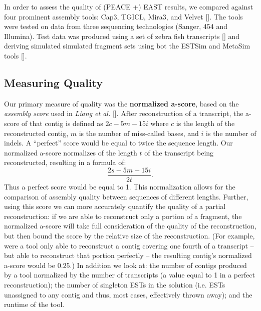 \documentclass{bioinfo}
\newcommand{\peace} {{\small PEACE}}
\newcommand{\capthree} {{\small Cap3}}
\newcommand{\estsim}{{\small ESTSim}}
\newcommand{\metasim} {{\small MetaSim}}
\newcommand{\tgicl} {{\small TGICL}}
\newcommand{\east} {{\small EAST}}
\newcommand{\velvet}{{\small Velvet}}
\newcommand{\mira}{{\small Mira3}}
\begin{document}

In order to assess the quality of (\peace\/ +) \east\/ results, we
compared against four prominent assembly tools: \capthree, \tgicl,
\mira, and \velvet\/ [\cite{Huang99,Pertea03,Chevreux04,Zerbino08}].
The tools were tested on data from three sequencing technologies
(Sanger, 454 and Illumina).  Test data was produced using a set of
zebra fish transcripts [\cite{Hazelhurst08}] and deriving simulated
simulated fragment sets using bot the \estsim\/ and \metasim\/ tools
[\cite{Hazelhurst03,Richter08}].

\subsection*{Measuring Quality}
Our primary measure of quality was the {\bf normalized a-score}, based
on the {\it assembly score} used in {\it Liang et al.}
[\cite{Liang00}].  After reconstruction of a transcript,
the a-score of that contig is defined as $2c - 5m - 15i$ where $c$ is
the length of the reconstructed contig, $m$ is the number of
miss-called bases, and $i$ is the number of indels.  A ``perfect''
score would be equal to twice the sequence length.  Our normalized
a-score normalizes of the length $t$ of the transcript being
reconstructed, resulting in a formula of:
$$\frac{2s - 5m - 15i}{2t}.$$
Thus a perfect score would be equal to 1.  This normalization allows
for the comparison of assembly quality between sequences of different
lengths. Further, using this score we can more accurately quantify the
quality of a partial reconstruction: if we are able to reconstruct
only a portion of a fragment, the normalized a-score will take full
consideration of the quality of the reconstruction, but then bound the
score by the relative size of the reconstruction.  (For example, were
a tool only able to reconstruct a contig covering one fourth of a
transcript -- but able to reconstruct that portion perfectly -- the
resulting contig's normalized a-score would be $0.25$.)  In addition
we look at: the number of contigs produced by a tool normalized by the
number of transcripts (a value equal to 1 in a perfect
reconstruction); the number of singleton ESTs in the solution
(i.e. ESTs unassigned to any contig and thus, most cases, effectively
thrown away); and the runtime of the tool.
\end{document}
